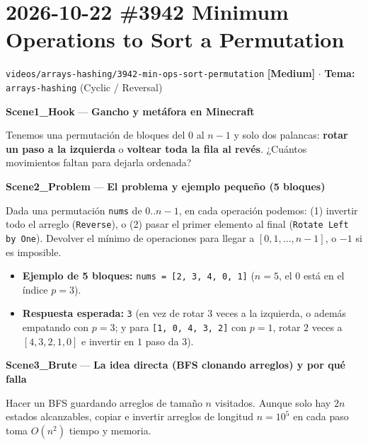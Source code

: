 \documentclass[letterpaper,10pt]{article}
\newcommand{\scene}[2]{\noindent\textbf{\textcolor{mcaqua}{#1}} --- \textbf{#2}\par\vspace{1pt}}
\newcommand{\folder}[1]{\texttt{\textcolor{mcgreen}{#1}}}
\newcommand{\badge}[2]{\textbf{\textcolor{#1}{[#2]}}}
\begin{document}
\newpage

\section{2026-10-22 \textbar{} \#3942 Minimum Operations to Sort a Permutation}
\folder{videos/arrays-hashing/3942-min-ops-sort-permutation} \hfill \badge{mcgold}{Medium} $\cdot$ \textbf{Tema:} \texttt{arrays-hashing} (Cyclic / Reversal)

\begin{shaded}
\scene{Scene1\_Hook}{Gancho y met\'afora en Minecraft}
Tenemos una permutaci\'on de bloques del $0$ al $n-1$ y solo dos palancas: \textbf{rotar un paso a la izquierda} o \textbf{voltear toda la fila al rev\'es}. ¿Cu\'antos movimientos faltan para dejarla ordenada?

\scene{Scene2\_Problem}{El problema y ejemplo peque\~no (5 bloques)}
Dada una permutaci\'on \texttt{nums} de $0..n-1$, en cada operaci\'on podemos: (1) invertir todo el arreglo (\texttt{Reverse}), o (2) pasar el primer elemento al final (\texttt{Rotate Left by One}). Devolver el m\'inimo de operaciones para llegar a $[0, 1, \dots, n-1]$, o $-1$ si es imposible.
\begin{itemize}\setlength{\itemsep}{1pt}
  \item \textbf{Ejemplo de 5 bloques:} \texttt{nums = [2, 3, 4, 0, 1]} ($n = 5$, el $0$ est\'a en el \'indice $p = 3$).
  \item \textbf{Respuesta esperada:} \texttt{3} (en vez de rotar $3$ veces a la izquierda, o adem\'as empatando con $p = 3$; y para \texttt{[1, 0, 4, 3, 2]} con $p = 1$, rotar $2$ veces a $[4,3,2,1,0]$ e invertir en $1$ paso da $3$).
\end{itemize}

\scene{Scene3\_Brute}{La idea directa (BFS clonando arreglos) y por qu\'e falla}
Hacer un BFS guardando arreglos de tama\~no $n$ visitados. Aunque solo hay $2n$ estados alcanzables, copiar e invertir arreglos de longitud $n = 10^5$ en cada paso toma $O(n^2)$ tiempo y memoria.


\end{shaded}
\end{document}
